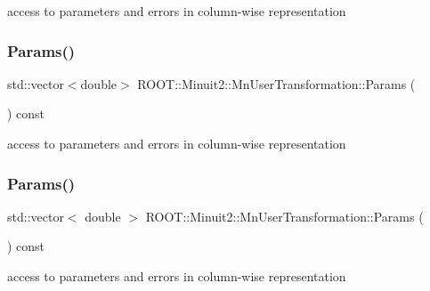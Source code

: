 access to parameters and errors in column-\/wise representation 

\mbox{\label{classROOT_1_1Minuit2_1_1MnUserTransformation_a6b95cc35815242b67b6bcc2a37d5e51a}} 
\subsubsection{\texorpdfstring{Params()}{Params()}\hspace{0.1cm}{\footnotesize\ttfamily [2/3]}}
{\footnotesize\ttfamily std\+::vector$<$double$>$ R\+O\+O\+T\+::\+Minuit2\+::\+Mn\+User\+Transformation\+::\+Params (\begin{DoxyParamCaption}{ }\end{DoxyParamCaption}) const}



access to parameters and errors in column-\/wise representation 

\mbox{\label{classROOT_1_1Minuit2_1_1MnUserTransformation_a85477022b0cfb39ccfe69a46cdaffe73}} 
\subsubsection{\texorpdfstring{Params()}{Params()}\hspace{0.1cm}{\footnotesize\ttfamily [3/3]}}
{\footnotesize\ttfamily std\+::vector$<$ double $>$ R\+O\+O\+T\+::\+Minuit2\+::\+Mn\+User\+Transformation\+::\+Params (\begin{DoxyParamCaption}{ }\end{DoxyParamCaption}) const}



access to parameters and errors in column-\/wise representation 

